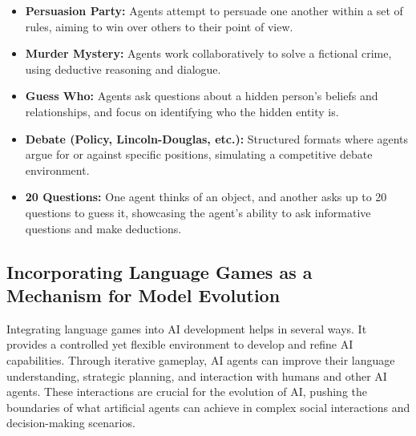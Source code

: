 \begin{itemize}
    \item \textbf{Persuasion Party:} Agents attempt to persuade one another within a set of rules, aiming to win over others to their point of view.
    \item \textbf{Murder Mystery:} Agents work collaboratively to solve a fictional crime, using deductive reasoning and dialogue.
    \item \textbf{Guess Who:} Agents ask questions about a hidden person's beliefs and relationships, and focus on identifying who the hidden entity is.
    \item \textbf{Debate (Policy, Lincoln-Douglas, etc.):} Structured formats where agents argue for or against specific positions, simulating a competitive debate environment.
    \item \textbf{20 Questions:} One agent thinks of an object, and another asks up to 20 questions to guess it, showcasing the agent's ability to ask informative questions and make deductions.
\end{itemize}

\subsection{Incorporating Language Games as a Mechanism for Model Evolution}

Integrating language games into AI development helps in several ways. It provides a controlled yet flexible environment to develop and refine AI capabilities. Through iterative gameplay, AI agents can improve their language understanding, strategic planning, and interaction with humans and other AI agents. These interactions are crucial for the evolution of AI, pushing the boundaries of what artificial agents can achieve in complex social interactions and decision-making scenarios.
